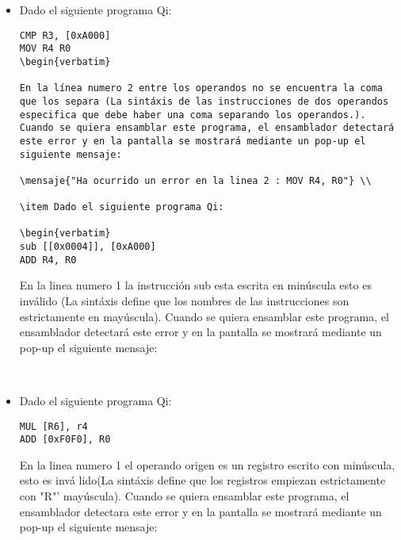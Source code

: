 \begin{itemize}
En la linea numero 1 el operando origen es directo lo cual es invalido en la arquitectura Q1 (El modo de direccionamiento Directo se incorpora en las arquitecturas Qi desde la arquitectura Q2 en adelante). Cuando el alumno quiera ensamblar este programa, el ensamblador detectará este error y en la pantalla se mostrará mediante un pop-up el siguiente mensaje:

 \\ 

\item Dado el siguiente programa Qi:

\begin{verbatim}
CMP R3, [0xA000]
MOV R4 R0 
\begin{verbatim}

En la línea numero 2 entre los operandos no se encuentra la coma que los separa (La sintáxis de las instrucciones de dos operandos especifica que debe haber una coma separando los operandos.). Cuando se quiera ensamblar este programa, el ensamblador detectará este error y en la pantalla se mostrará mediante un pop-up el siguiente mensaje:

\mensaje{"Ha ocurrido un error en la linea 2 : MOV R4, R0"} \\ 

\item Dado el siguiente programa Qi:

\begin{verbatim}
sub [[0x0004]], [0xA000]
ADD R4, R0
\end{verbatim}

En la linea numero 1 la instrucción sub esta escrita en minúscula esto es inválido (La sintáxis define que los nombres de las instrucciones son estrictamente en mayúscula). Cuando se quiera ensamblar este programa, el ensamblador detectará este error y en la pantalla se mostrará mediante un pop-up el siguiente mensaje:

 \\ 

\item Dado el siguiente programa Qi:

\begin{verbatim}
MUL [R6], r4
ADD [0xF0F0], R0
\end{verbatim}

En la linea numero 1 el operando origen es un registro escrito con minúscula, esto es invá lido(La sintáxis define que los registros empiezan estrictamente con "R"' mayúscula). Cuando se quiera ensamblar este programa, el ensamblador detectara este error y en la pantalla se mostrará mediante un pop-up el siguiente mensaje:


\end{itemize}
